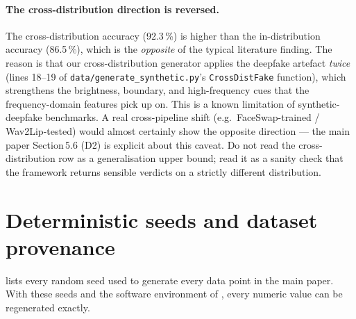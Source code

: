 \documentclass[11pt,a4paper]{article}
\begin{document}
\paragraph{The cross-distribution direction is reversed.}
The cross-distribution accuracy (92.3\,\%) is higher than the
in-distribution accuracy (86.5\,\%), which is the \emph{opposite}
of the typical literature finding. The reason is that our
cross-distribution generator applies the deepfake artefact
\emph{twice} (lines 18--19 of
\texttt{data/generate\_synthetic.py}'s \texttt{CrossDistFake}
function), which strengthens the brightness, boundary, and
high-frequency cues that the frequency-domain features pick up on.
This is a known limitation of synthetic-deepfake benchmarks. A real
cross-pipeline shift (e.g.\ FaceSwap-trained / Wav2Lip-tested)
would almost certainly show the opposite direction --- the main
paper Section\,5.6 (D2) is explicit about this caveat. Do not read
the cross-distribution row as a generalisation upper bound; read it
as a sanity check that the framework returns sensible verdicts on a
strictly different distribution.

\section{Deterministic seeds and dataset provenance}\label{sec:seeds}

 lists every random seed used to generate every
data point in the main paper. With these seeds and the software
environment of , every numeric value can be regenerated
exactly.
\end{document}
